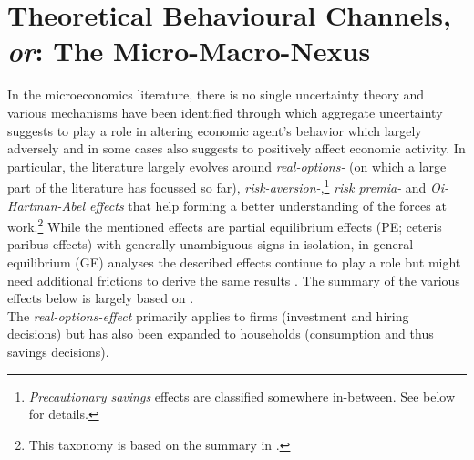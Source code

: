 \documentclass[a4paper,11pt,listof=nochaptergap,oneside,pointednumbers,bibtotoc,bigheadings,liststotoc,hidelinks]{scrbook}
\theoremstyle{mysatz}
\theoremstyle{mydefinition}
\theoremstyle{mytheorem}
\theoremstyle{mybemerkung}
\begin{document}
\section[Theoretical Behavioural Channels, \textit{or}: The Micro-Macro-Nexus]{Theoretical Behavioural Channels, \textit{or}: The Micro-Macro-Nexus}
\label{sec:studiedeffectsinrelatedliterature}

In the microeconomics literature, there is no single uncertainty theory and various mechanisms have been identified through which aggregate uncertainty suggests to play a role in altering economic agent's behavior which largely adversely and in some cases also suggests to positively affect economic activity. In particular, the literature largely evolves around \textit{real-options-} (on which a large part of the literature has focussed so far), \textit{risk-aversion-},\footnote{\textit{Precautionary savings} effects are classified somewhere in-between. See below for details.} \textit{risk premia-} and \textit{Oi-Hartman-Abel effects} that help forming a better understanding of the forces at work.\footnote{This taxonomy is based on the summary in \citet{bloom:14}.} While the mentioned effects are partial equilibrium effects (PE; ceteris paribus effects) with generally unambiguous signs in isolation, in general equilibrium (GE) analyses the described effects continue to play a role but might need additional frictions to derive the same results \citep{juradoetal:15}. The summary of the various effects below is largely based on \citet{bloom:14}.\\

The \textit{real-options-effect} primarily applies to firms (investment and hiring decisions) but has also been expanded to households (consumption and thus savings decisions). 
\end{document}
